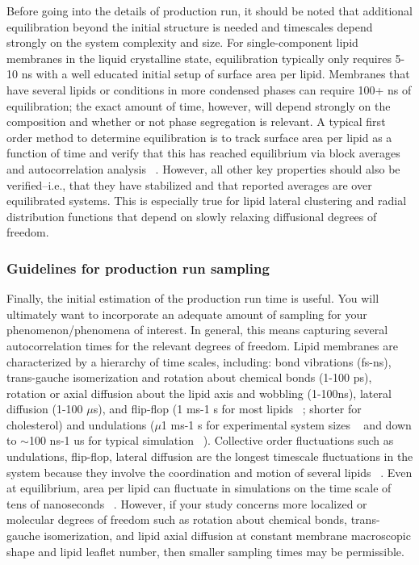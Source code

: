 \documentclass[9pt,bestpractices,pubversion]{livecoms}
\begin{document}
Before going into the details of production run, it should be noted that additional equilibration beyond the initial structure is needed and timescales depend strongly on the system complexity and size.
For single-component lipid membranes in the liquid crystalline state, equilibration typically only requires 5-10 ns with a well educated initial setup of surface area per lipid.
Membranes that have several lipids or conditions in more condensed phases can require 100+ ns of equilibration; the exact amount of time, however, will depend strongly on the composition and whether or not phase segregation is relevant.
A typical first order method to determine equilibration is to track surface area per lipid as a function of time and verify that this has reached equilibrium via block averages and autocorrelation analysis ~\cite{Venable2015}.
However, all other key properties should also be verified--i.e., that they have stabilized and that reported averages are over equilibrated systems.
This is especially true for lipid lateral clustering and radial distribution functions that depend on slowly relaxing diffusional degrees of freedom.

\subsubsection{Guidelines for production run sampling}
\label{subsubsec:prodrun}
Finally, the initial estimation of the production run time is useful.
You will ultimately want to incorporate an adequate amount of sampling for your phenomenon/phenomena of interest.
In general, this means capturing several autocorrelation times for the relevant degrees of freedom.
Lipid membranes are characterized by a hierarchy of time scales, including: bond vibrations (fs-ns), trans-gauche isomerization and rotation about chemical bonds (1-100 ps), rotation or axial diffusion about the lipid axis and wobbling (1-100ns), lateral diffusion (1-100 $\mu$s), and flip-flop (1 ms-1 s for most lipids ~\cite{Vermeer2007,Konig1996,Leftin2011}; shorter for cholesterol) and undulations ($\mu$1 ms-1 s for experimental system sizes ~\cite{Vermeer2007} and down to $\sim$100 ns-1 us for typical simulation ~\cite{Bochicchio2016}).
Collective order fluctuations such as undulations, flip-flop, lateral diffusion are the longest timescale fluctuations in the system because they involve the coordination and motion of several lipids  ~\cite{Vermeer2007}.
Even at equilibrium, area per lipid can fluctuate in simulations on the time scale of tens of nanoseconds  ~\cite{Poger2016,Venable2015}.
However, if your study concerns more localized or molecular degrees of freedom such as rotation about chemical bonds, trans-gauche isomerization, and lipid axial diffusion at constant membrane macroscopic shape and lipid leaflet number, then smaller sampling times may be permissible.
\end{document}
